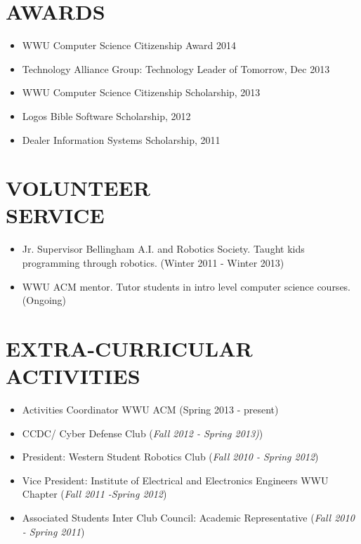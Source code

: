 \documentclass[line,margin]{res}
\begin{document}
\begin{resume}
\section{AWARDS}
	\begin{itemize} \itemsep -1pt
		\item WWU Computer Science Citizenship Award 2014
		\item Technology Alliance Group: Technology Leader of Tomorrow, Dec 2013
		\item WWU Computer Science Citizenship Scholarship, 2013
		\item Logos Bible Software Scholarship, 2012
		\item Dealer Information Systems Scholarship, 2011
	\end{itemize}
 
\section{VOLUNTEER \\ SERVICE}
		\begin{itemize} \itemsep -1pt
			\item Jr. Supervisor Bellingham A.I. and Robotics Society.  Taught kids programming through robotics. (Winter 2011 - Winter 2013)
			\item WWU ACM mentor.  Tutor students in intro level computer science courses.  (Ongoing)
		\end{itemize}

\section{EXTRA-CURRICULAR \\ ACTIVITIES} 
	\begin{itemize} \itemsep -1pt
	\item Activities Coordinator WWU ACM (Spring 2013 - present)
	\item CCDC/ Cyber Defense Club ({\sl Fall 2012 - Spring 2013)})
	\item President: Western Student Robotics Club ({\sl Fall 2010 - Spring 2012})
 	\item Vice President: Institute of Electrical and Electronics Engineers WWU Chapter ({\sl Fall 2011 -Spring 2012})
	\item Associated Students Inter Club Council: Academic Representative ({\sl Fall 2010 - Spring 2011})
	\end{itemize}
\end{resume}
\end{document}
